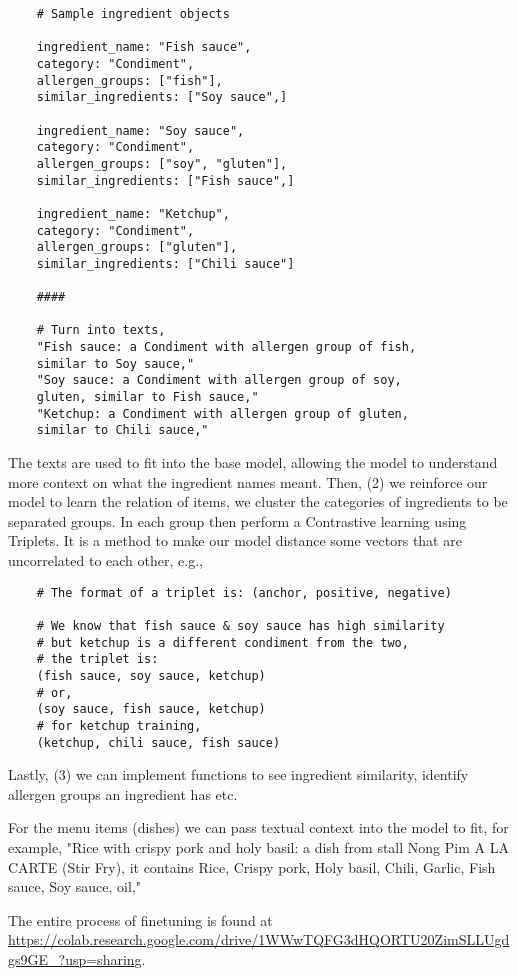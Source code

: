 \begin{verbatim}
    # Sample ingredient objects

    ingredient_name: "Fish sauce",
    category: "Condiment",
    allergen_groups: ["fish"],
    similar_ingredients: ["Soy sauce",]

    ingredient_name: "Soy sauce",
    category: "Condiment",
    allergen_groups: ["soy", "gluten"],
    similar_ingredients: ["Fish sauce",]

    ingredient_name: "Ketchup",
    category: "Condiment",
    allergen_groups: ["gluten"],
    similar_ingredients: ["Chili sauce"]

    ####

    # Turn into texts,
    "Fish sauce: a Condiment with allergen group of fish,
    similar to Soy sauce,"
    "Soy sauce: a Condiment with allergen group of soy,
    gluten, similar to Fish sauce,"
    "Ketchup: a Condiment with allergen group of gluten,
    similar to Chili sauce,"
\end{verbatim}

The texts are used to fit into the base model, allowing the model to understand more context on what the ingredient names meant. Then,
(2) we reinforce our model to learn the relation of items, we cluster the categories of ingredients to be separated groups. In each group then
perform a Contrastive learning using Triplets. It is a method to make our model distance some vectors that are uncorrelated to each other, e.g.,

\begin{verbatim}
    # The format of a triplet is: (anchor, positive, negative)

    # We know that fish sauce & soy sauce has high similarity
    # but ketchup is a different condiment from the two,
    # the triplet is:
    (fish sauce, soy sauce, ketchup)
    # or,
    (soy sauce, fish sauce, ketchup)
    # for ketchup training,
    (ketchup, chili sauce, fish sauce)
\end{verbatim}

Lastly, (3) we can implement functions to see ingredient similarity,
identify allergen groups an ingredient has etc.

For the menu items (dishes) we can pass textual context into the model to fit, for example,
"Rice with crispy pork and holy basil: a dish from stall Nong Pim A LA CARTE (Stir Fry),
it contains Rice, Crispy pork, Holy basil, Chili, Garlic, Fish sauce, Soy sauce, oil,"

The entire process of finetuning is found at \url{https://colab.research.google.com/drive/1WWwTQFG3dHQORTU20ZimSLLUgdgs9GE_?usp=sharing}.

